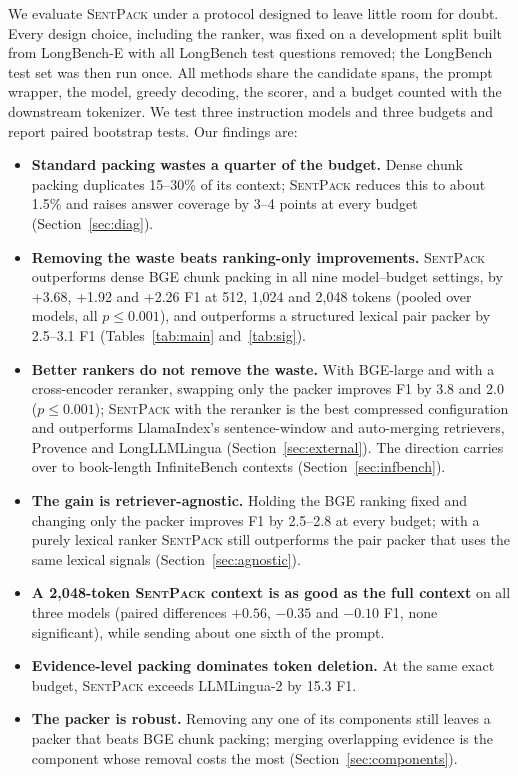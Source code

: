 \documentclass[11pt]{article}
\newcommand{\spk}{\textsc{SentPack}}
\begin{document}
We evaluate \spk{} under a protocol designed to leave little room for doubt. Every design choice, including the ranker, was fixed on a development split built from LongBench-E with all LongBench test questions removed; the LongBench test set was then run once. All methods share the candidate spans, the prompt wrapper, the model, greedy decoding, the scorer, and a budget counted with the downstream tokenizer. We test three instruction models and three budgets and report paired bootstrap tests. Our findings are:

\begin{itemize}
\item \textbf{Standard packing wastes a quarter of the budget.} Dense chunk packing duplicates 15--30\% of its context; \spk{} reduces this to about 1.5\% and raises answer coverage by 3--4 points at every budget (Section~\ref{sec:diag}).
\item \textbf{Removing the waste beats ranking-only improvements.} \spk{} outperforms dense BGE chunk packing in all nine model--budget settings, by +3.68, +1.92 and +2.26 F1 at 512, 1,024 and 2,048 tokens (pooled over models, all $p\le0.001$), and outperforms a structured lexical pair packer by 2.5--3.1 F1 (Tables~\ref{tab:main} and~\ref{tab:sig}).
\item \textbf{Better rankers do not remove the waste.} With BGE-large and with a cross-encoder reranker, swapping only the packer improves F1 by 3.8 and 2.0 ($p\le0.001$); \spk{} with the reranker is the best compressed configuration and outperforms LlamaIndex's sentence-window and auto-merging retrievers, Provence and LongLLMLingua (Section~\ref{sec:external}). The direction carries over to book-length InfiniteBench contexts (Section~\ref{sec:infbench}).
\item \textbf{The gain is retriever-agnostic.} Holding the BGE ranking fixed and changing only the packer improves F1 by 2.5--2.8 at every budget; with a purely lexical ranker \spk{} still outperforms the pair packer that uses the same lexical signals (Section~\ref{sec:agnostic}).
\item \textbf{A 2,048-token \spk{} context is as good as the full context} on all three models (paired differences $+0.56$, $-0.35$ and $-0.10$ F1, none significant), while sending about one sixth of the prompt.
\item \textbf{Evidence-level packing dominates token deletion.} At the same exact budget, \spk{} exceeds LLMLingua-2 by 15.3 F1.
\item \textbf{The packer is robust.} Removing any one of its components still leaves a packer that beats BGE chunk packing; merging overlapping evidence is the component whose removal costs the most (Section~\ref{sec:components}).
\end{itemize}
\end{document}
